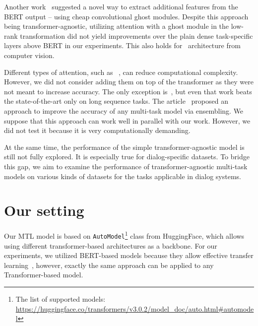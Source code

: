 Another work~\cite{GhostBert2021} suggested a novel way to extract additional features from the BERT output -- using cheap convolutional ghost modules. Despite this approach being transformer-agnostic, utilizing attention with a ghost module in the low-rank transformation did not yield improvements over the plain dense task-specific layers above BERT in our experiments. This also holds for~\cite{el-nouby2021xcit} architecture from computer vision.


Different types of attention, such as ~\cite{reformer}, can reduce computational complexity. However, we did not consider adding them on top of the transformer as they were not meant to increase accuracy. The only exception is~\cite{routing_transformers}, but even that work beats the state-of-the-art only on long sequence tasks.%
The article~\cite{Multi-taskEnsemble:19} proposed an approach to improve the accuracy of any multi-task model via ensembling. We suppose that this approach can work well in parallel with our work. However, we did not test it because it is very computationally demanding.


At the same time, the performance of the simple transformer-agnostic model is still not fully explored. It is especially true for dialog-specific datasets. To bridge this gap, we aim to examine the performance of transformer-agnostic multi-task models on various kinds of datasets for the tasks applicable in dialog systems.
\section{Our setting}


Our MTL model is based on \texttt{AutoModel}\footnote{The list of supported models: \url{https://huggingface.co/transformers/v3.0.2/model_doc/auto.html\#automodel}} class from HuggingFace, which allows using different transformer-based architectures as a backbone. For our experiments, we utilized BERT-based models because they allow effective transfer learning~\cite{10.1007/978-3-031-19032-2_46, ksquad}, however, exactly the same approach can be applied to any Transformer-based model.


